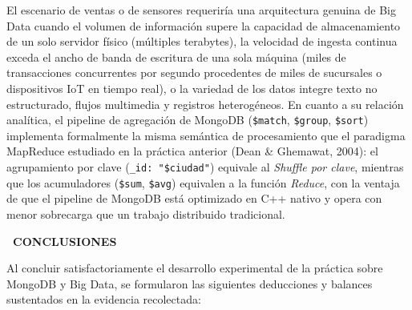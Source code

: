 \documentclass[12pt,a4paper]{article}
\newcommand{\llav}{\symbol{60}\symbol{60}}
\newcommand{\rlav}{\symbol{62}\symbol{62}}
\newcommand{\marcador}[1]{\llav\ #1\ \rlav}
\newcommand{\seccion}[1]{%
  \vspace{0.6cm}%
  {\centering\bfseries\fontsize{12pt}{14pt}\selectfont\marcador{\MakeUppercase{#1}}\par}%
  \vspace{0.35cm}%
}
\begin{document}
\begin{enumerate}
    El escenario de ventas o de sensores requeriría una arquitectura genuina de Big Data cuando el volumen de información supere la capacidad de almacenamiento de un solo servidor físico (múltiples terabytes), la velocidad de ingesta continua exceda el ancho de banda de escritura de una sola máquina (miles de transacciones concurrentes por segundo procedentes de miles de sucursales o dispositivos IoT en tiempo real), o la variedad de los datos integre texto no estructurado, flujos multimedia y registros heterogéneos. En cuanto a su relación analítica, el pipeline de agregación de MongoDB (\texttt{\$match}, \texttt{\$group}, \texttt{\$sort}) implementa formalmente la misma semántica de procesamiento que el paradigma MapReduce estudiado en la práctica anterior (Dean \& Ghemawat, 2004): el agrupamiento por clave (\texttt{\_id: "\$ciudad"}) equivale al \textit{Shuffle por clave}, mientras que los acumuladores (\texttt{\$sum}, \texttt{\$avg}) equivalen a la función \textit{Reduce}, con la ventaja de que el pipeline de MongoDB está optimizado en C++ nativo y opera con menor sobrecarga que un trabajo distribuido tradicional.
\end{enumerate}

\clearpage

\seccion{CONCLUSIONES}

Al concluir satisfactoriamente el desarrollo experimental de la práctica sobre MongoDB y Big Data, se formularon las siguientes deducciones y balances sustentados en la evidencia recolectada:
\end{document}
